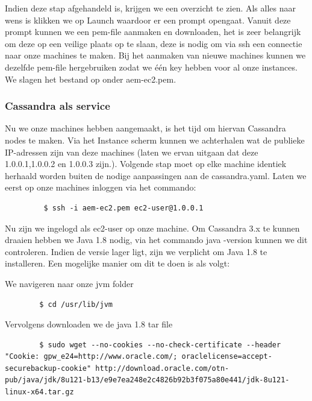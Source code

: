 	\par
	Indien deze stap afgehandeld is, krijgen we een overzicht te zien. 
	Als alles naar wens is klikken we op \textquotedbl Launch\textquotedbl{} waardoor er een prompt opengaat. 
	Vanuit deze prompt kunnen we een pem-file aanmaken en downloaden, het is zeer belangrijk om 
	deze op een veilige plaats op te slaan, deze is nodig om via ssh een connectie naar onze machines te maken. 
	Bij het aanmaken van nieuwe machines kunnen we dezelfde pem-file hergebruiken zodat we \'e\'en key hebben voor al onze instances.
	 We slagen het bestand op onder aem-ec2.pem.
	
	\subsubsection{Cassandra als service}
	Nu we onze machines hebben aangemaakt, is het tijd om hiervan Cassandra nodes te maken. 
	Via het \textquotedbl Instance\textquotedbl{} scherm kunnen we achterhalen wat de publieke IP-adressen zijn van deze machines 
	(laten we ervan uitgaan dat deze 1.0.0.1,1.0.0.2 en 1.0.0.3 zijn.). 
	Volgende stap moet op elke machine identiek herhaald worden buiten de nodige aanpassingen aan de cassandra.yaml. 
	Laten we eerst op onze machines inloggen via het commando:
	
	\begin{lstlisting}
		 $ ssh -i aem-ec2.pem ec2-user@1.0.0.1
	\end{lstlisting}
	
	Nu zijn we ingelogd als ec2-user op onze machine. Om Cassandra 3.x te kunnen draaien hebben we Java 1.8 nodig, 
	via het commando \textquotedbl java -version\textquotedbl{} kunnen we dit controleren. 
	Indien de versie lager ligt, zijn we verplicht om Java 1.8 te installeren. Een mogelijke manier om dit te doen is als volgt:	
	\par
	We navigeren naar onze jvm folder
	\begin{lstlisting}
  		$ cd /usr/lib/jvm
	\end{lstlisting}
	\par
	Vervolgens downloaden we de java 1.8 tar file
	\begin{lstlisting}
		$ sudo wget --no-cookies --no-check-certificate --header "Cookie: gpw_e24=http://www.oracle.com/; oraclelicense=accept-securebackup-cookie" http://download.oracle.com/otn-pub/java/jdk/8u121-b13/e9e7ea248e2c4826b92b3f075a80e441/jdk-8u121-linux-x64.tar.gz
	\end{lstlisting}
	
